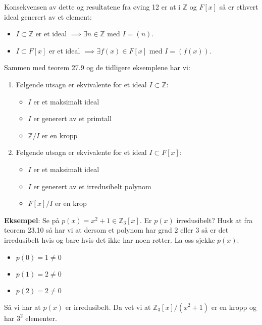 Konsekvensen av dette og resultatene fra øving 12 er at i $\mathbb{Z}$ og $F[x]$ så er ethvert
ideal generert av et element:
\begin{itemize}
	\item $I \subset \mathbb{Z}$ er et ideal $\implies \exists n\in \mathbb{Z}$ med $I=(n)$.
	\item $I\subset F[x]$ er et ideal $\implies\exists f(x)\in F[x]$ med $I=(f(x))$.
\end{itemize}

Sammen med teorem 27.9 og de tidligere eksemplene har vi:
\begin{enumerate}
	\item Følgende utsagn er ekvivalente for et ideal $I\subset \mathbb{Z}$:
	      \begin{itemize}
		      \item $I$ er et maksimalt ideal
		      \item $I$ er generert av et primtall
		      \item $\mathbb{Z}/I$ er en kropp
	      \end{itemize}
	\item Følgende utsagn er ekvivalente for et ideal $I\subset F[x]$:
	      \begin{itemize}
		      \item $I$ er et maksimalt ideal
		      \item $I$ er generert av et irredusibelt polynom
		      \item $F[x]/I$ er en krop
	      \end{itemize}
\end{enumerate}

\textbf{Eksempel}:
Se på $p(x)=x^2+1\in \mathbb{Z}_3[x]$. Er $p(x)$ irredusibelt? Husk at fra teorem 23.10 så har
vi at dersom et polynom har grad 2 eller 3 så er det irredusibelt hvis og bare hvis det ikke har
noen røtter. La oss sjekke $p(x)$:
\begin{itemize}
	\item $p(0)=1\neq 0$
	\item $p(1)=2\neq 0$
	\item $p(2)=2\neq 0$
\end{itemize}
Så vi har at $p(x)$ er irredusibelt. Da vet vi at $\mathbb{Z}_3[x]/(x^2+1)$ er en kropp og har
$3^2$ elementer.

